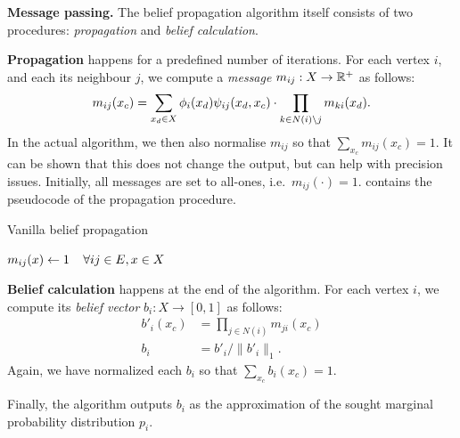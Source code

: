 \documentclass[letterpaper]{article}
\newcommand{\mypar}[1]{{\bf #1.}}
\newcommand{\myparcont}[1]{{\bf #1}}
\begin{document}
\mypar{Message passing} The belief propagation algorithm itself consists of two
procedures: \emph{propagation} and \emph{belief calculation}.

\myparcont{Propagation} happens for a predefined number of iterations. For each vertex $i$, and each its neighbour $j$, we compute a \emph{message} $m_{ij} : X \to \mathbb{R}^+$ as follows:
%
$$m_{ij}(x_c) = \sum_{x_d \in X} \phi_i(x_d)\psi_{ij}(x_d, x_c) \cdot \prod_{k \in N(i) \setminus j} m_{ki}(x_d).$$
%
In the actual algorithm, we then also normalise $m_{ij}$ so that $\sum_{x_c}
m_{ij}(x_c) = 1$. It can be shown that this does not change the output, but can
help with precision issues. Initially, all messages are set to all-ones,
i.e.~$m_{ij}(\cdot) = 1$.
%
 contains the pseudocode of the propagation procedure.

\begin{algorithm}
\caption{Vanilla belief propagation}
\label{algo:propagate}
\algodefaults
	$m_{ij}(x) \leftarrow 1\mkern 20mu\forall ij \in E, x \in X$\;
	
\end{algorithm}

\myparcont{Belief calculation} happens at the end of the algorithm. For each
vertex $i$, we compute its \emph{belief vector} $b_i: X \to [0, 1]$ as follows:
%
\begin{align*}
	b'_i(x_c) &= \prod_{j \in N(i)} m_{ji}(x_c) \\
	b_i &= b'_{i} / \|b'_i\|_1.
\end{align*}
%
Again, we have normalized each $b_i$ so that $\sum_{x_c} b_i(x_c) = 1$.

Finally, the algorithm outputs $b_i$ as the approximation of the sought
marginal probability distribution $p_i$.
\end{document}
